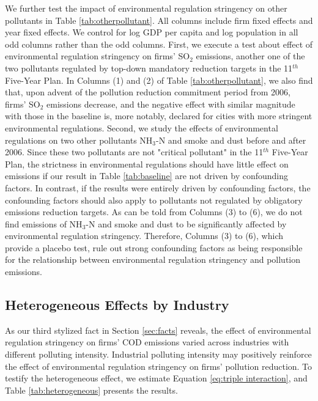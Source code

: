 \documentclass[12pt,english]{article}
\begin{document}
We further test the impact of environmental regulation stringency on other pollutants in Table \ref{tab:otherpollutant}. All columns include firm fixed effects and year fixed effects. We control for log GDP per capita and log population in all odd columns rather than the odd columns. First, we execute a test about effect of environmental regulation stringency on firms' SO$_{2}$ emissions, another one of the two pollutants regulated by top-down mandatory reduction targets in the 11$^{th}$ Five-Year Plan. In Columns (1) and (2) of Table \ref{tab:otherpollutant}, we also find that, upon advent of the pollution reduction commitment period from 2006, firms' SO$_{2}$ emissions decrease, and the negative effect with similar magnitude with those in the baseline is, more notably, declared for cities with more stringent environmental regulations. Second, we study the effects of environmental regulations on two other pollutants NH$_{3}$-N and smoke and dust before and after 2006. Since these two pollutants are not "critical pollutant" in the 11$^{th}$ Five-Year Plan, the strictness in environmental regulations should have little effect on emissions if our result in Table \ref{tab:baseline} are not driven by confounding factors.   In contrast, if the results were entirely driven by confounding factors, the confounding factors should also apply to pollutants not regulated by obligatory emissions reduction targets. As can be told from Columns (3) to (6), we do not find emissions of NH$_{3}$-N and smoke and dust to be significantly affected by environmental regulation stringency. Therefore, Columns (3) to (6), which provide a placebo test, rule out strong confounding factors as being responsible for the relationship between environmental regulation stringency and pollution emissions.



\subsection{Heterogeneous Effects by Industry}\label{sec:heterogeneous}

As our third stylized fact in Section \ref{sec:facts} reveals, the effect of environmental regulation stringency on firms' COD emissions varied across industries with different polluting intensity. Industrial polluting intensity may positively reinforce the effect of environmental regulation stringency on firms' pollution reduction. To testify the heterogeneous effect, we estimate Equation \ref{eq:triple interaction}, and Table \ref{tab:heterogeneous} presents the results.
\end{document}
